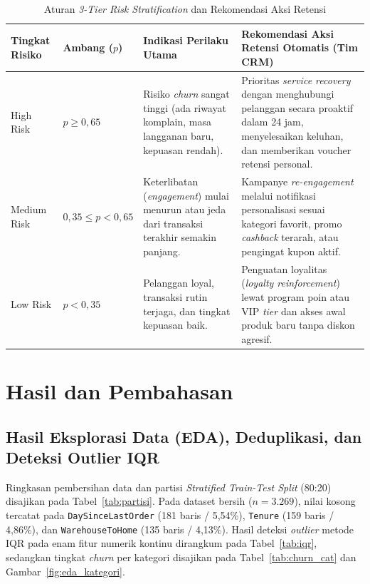 \documentclass[11pt,a4paper]{article}
\DeclareRobustCommand{\code}[1]{\texttt{\textcolor{CodeColor}{#1}}}
\newcommand{\thdr}[1]{\textbf{#1}}
\begin{document}
\begin{table}[H]
\begin{tabularx}{\textwidth}{@{}P{1.9cm} M{1.6cm} M{2.4cm} P{3.2cm} L@{}}
    \bottomrule
  \end{tabularx}
\end{table}

\begin{table}[H]
  \centering
  \caption{Aturan \textit{3-Tier Risk Stratification} dan Rekomendasi Aksi Retensi}
  \label{tab:risk_tier}
  \renewcommand{\arraystretch}{1.25}
  \setlength{\tabcolsep}{4pt}
  \footnotesize
  \begin{tabularx}{\textwidth}{@{}M{1.8cm} M{2.1cm} L L@{}}
    \toprule
    \thdr{Tingkat Risiko} & \thdr{Ambang ($p$)} & \thdr{Indikasi Perilaku Utama} & \thdr{Rekomendasi Aksi Retensi Otomatis (Tim CRM)} \\
    \midrule
    High Risk & $p \ge 0{,}65$ & Risiko \textit{churn} sangat tinggi (ada riwayat komplain, masa langganan baru, kepuasan rendah). & Prioritas \textit{service recovery} dengan menghubungi pelanggan secara proaktif dalam 24 jam, menyelesaikan keluhan, dan memberikan voucher retensi personal. \\
    Medium Risk & $0{,}35 \le p < 0{,}65$ & Keterlibatan (\textit{engagement}) mulai menurun atau jeda dari transaksi terakhir semakin panjang. & Kampanye \textit{re-engagement} melalui notifikasi personalisasi sesuai kategori favorit, promo \textit{cashback} terarah, atau pengingat kupon aktif. \\
    Low Risk & $p < 0{,}35$ & Pelanggan loyal, transaksi rutin terjaga, dan tingkat kepuasan baik. & Penguatan loyalitas (\textit{loyalty reinforcement}) lewat program poin atau VIP \textit{tier} dan akses awal produk baru tanpa diskon agresif. \\
    \bottomrule
  \end{tabularx}
\end{table}

\section{Hasil dan Pembahasan}

\subsection{Hasil Eksplorasi Data (EDA), Deduplikasi, dan Deteksi Outlier IQR}

Ringkasan pembersihan data dan partisi \textit{Stratified Train-Test Split} (80:20) disajikan pada Tabel~\ref{tab:partisi}. Pada dataset bersih ($n = 3.269$), nilai kosong tercatat pada \code{DaySinceLastOrder} (181 baris / 5,54\%), \code{Tenure} (159 baris / 4,86\%), dan \code{WarehouseToHome} (135 baris / 4,13\%). Hasil deteksi \textit{outlier} metode IQR pada enam fitur numerik kontinu dirangkum pada Tabel~\ref{tab:iqr}, sedangkan tingkat \textit{churn} per kategori disajikan pada Tabel~\ref{tab:churn_cat} dan Gambar~\ref{fig:eda_kategori}.
\end{document}
